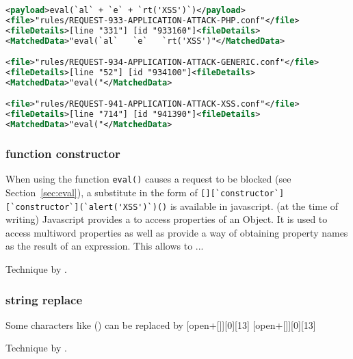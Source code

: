 \begin{lstlisting}[style=ruleStyle, language=XML, caption=eval(`al` + `e` + `rt('XSS')`) blocking example, label={lst:listing-evalalertXSSblocked}]
<payload>eval(`al` + `e` + `rt('XSS')`)</payload>
<file>"rules/REQUEST-933-APPLICATION-ATTACK-PHP.conf"</file>
<fileDetails>[line "331"] [id "933160"]<fileDetails>
<MatchedData>"eval(`al`   `e`   `rt('XSS')"</MatchedData>

<file>"rules/REQUEST-934-APPLICATION-ATTACK-GENERIC.conf"</file>
<fileDetails>[line "52"] [id "934100"]<fileDetails>
<MatchedData>"eval("</MatchedData>

<file>"rules/REQUEST-941-APPLICATION-ATTACK-XSS.conf"</file>
<fileDetails>[line "714"] [id "941390"]<fileDetails>
<MatchedData>"eval("</MatchedData>
\end{lstlisting}

\subsubsection{function constructor}

When using the function \verb|eval()| causes a request to be blocked (see Section~\ref{sec:eval}), a substitute in the form of \verb|[][`constructor`][`constructor`](`alert('XSS')`)()| is available in javascript.
	{\color{red}(at the time of writing)}
Javascript provides a  to access properties of an Object. It is used to access multiword properties as well as provide a way of obtaining property names as the result of an expression. \cite{js/brackets}
This  allows to ...

Technique by \cite{onecons/wafbypass}.


\subsubsection{string replace}

Some characters like () can be replaced by [open+[]][0][13] [open+[]][0][13]

Technique by \cite{onecons/wafbypass}.

